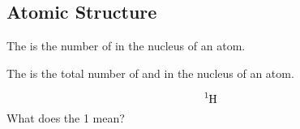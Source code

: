 \documentclass[12pt]{exam}
\begin{document}
\twocolumn
    \begin{questions}
        

    \section{Atomic Structure}

    \question The  is the number of \fillin[protons][3cm] in the nucleus of an atom.

    \question The  is the total number of \fillin[protons][3cm] and \fillin[neutrons][3cm]in the nucleus of an atom.



\question 
$$\ce{^{1}_{}H}$$
What does the 1 mean?

\fillwithlines{2cm}

    \end{questions}
\end{document}
